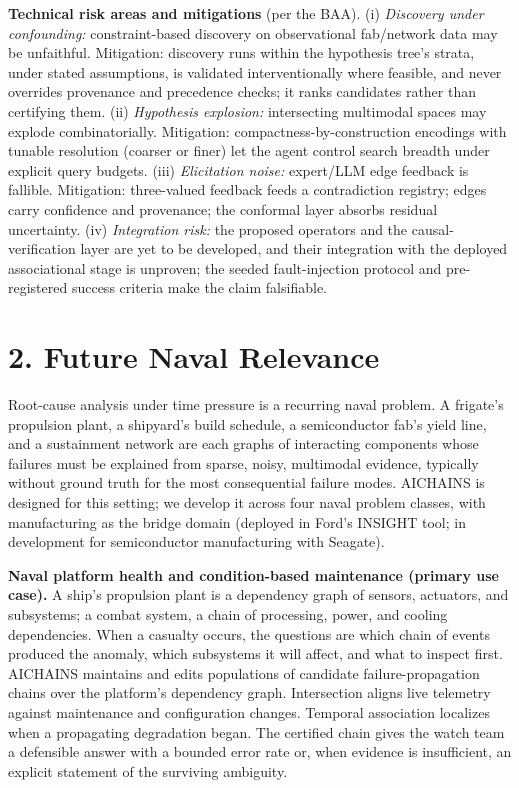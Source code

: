 \documentclass[12pt]{article}
\begin{document}
\textbf{Technical risk areas and mitigations} (per the BAA). (i) \emph{Discovery under confounding:} constraint-based discovery on observational fab/network data may be unfaithful. Mitigation: discovery runs within the hypothesis tree's strata, under stated assumptions, is validated interventionally where feasible, and never overrides provenance and precedence checks; it ranks candidates rather than certifying them. (ii) \emph{Hypothesis explosion:} intersecting multimodal spaces may explode combinatorially. Mitigation: compactness-by-construction encodings with tunable resolution (coarser or finer) let the agent control search breadth under explicit query budgets. (iii) \emph{Elicitation noise:} expert/LLM edge feedback is fallible. Mitigation: three-valued feedback feeds a contradiction registry; edges carry confidence and provenance; the conformal layer absorbs residual uncertainty. (iv) \emph{Integration risk:} the proposed operators and the causal-verification layer are yet to be developed, and their integration with the deployed associational stage is unproven; the seeded fault-injection protocol and pre-registered success criteria make the claim falsifiable.

\section*{2. Future Naval Relevance}

Root-cause analysis under time pressure is a recurring naval problem. A frigate's propulsion plant, a shipyard's build schedule, a semiconductor fab's yield line, and a sustainment network are each graphs of interacting components whose failures must be explained from sparse, noisy, multimodal evidence, typically without ground truth for the most consequential failure modes. AICHAINS is designed for this setting; we develop it across four naval problem classes, with manufacturing as the bridge domain (deployed in Ford's INSIGHT tool; in development for semiconductor manufacturing with Seagate).

\textbf{Naval platform health and condition-based maintenance (primary use case).} A ship's propulsion plant is a dependency graph of sensors, actuators, and subsystems; a combat system, a chain of processing, power, and cooling dependencies. When a casualty occurs, the questions are which chain of events produced the anomaly, which subsystems it will affect, and what to inspect first. AICHAINS maintains and edits populations of candidate failure-propagation chains over the platform's dependency graph. Intersection aligns live telemetry against maintenance and configuration changes. Temporal association localizes when a propagating degradation began. The certified chain gives the watch team a defensible answer with a bounded error rate or, when evidence is insufficient, an explicit statement of the surviving ambiguity.
\end{document}
